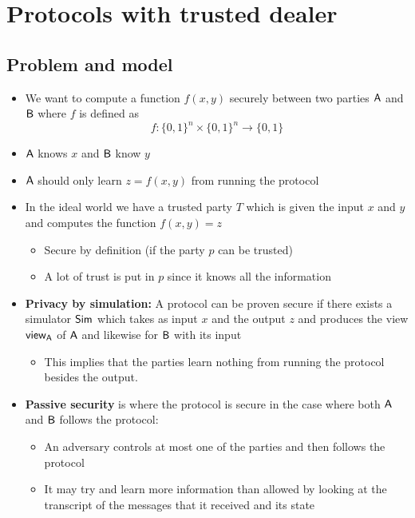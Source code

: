 \section{Protocols with trusted dealer}
\localtableofcontents
\subsection{Problem and model}%
\begin{itemize}
    \item We want to compute a function $f(x,y)$ securely between two parties $\mathsf{A}$ and $\mathsf{B}$ where $f$ is defined as 
    \begin{equation*}
        f : \{0,1\}^n \times \{0,1\}^n \to \{0,1\}
    \end{equation*}
    \item $\mathsf{A}$ knows $x$ and $\mathsf{B}$ know $y$
    \item $\mathsf{A}$ should only learn $z = f(x,y)$ from running the protocol
    \item In the ideal world we have a trusted party $T$ which is given the input $x$ and $y$ and computes the function $f(x,y) = z$ 
    \begin{itemize}
        \item Secure by definition (if the party $p$ can be trusted)
        \item A lot of trust is put in $p$ since it knows all the information
    \end{itemize}
    \item \textbf{Privacy by simulation:} A protocol can be proven secure if there exists a simulator $\mathsf{Sim}$ which takes as input $x$ and the output $z$ and produces the view $\mathsf{view}_{\mathsf{A}}$ of $\mathsf{A}$ and likewise for $\mathsf{B}$ with its input
        \begin{itemize}
            \item This implies that the parties learn nothing from running the protocol besides the output.
        \end{itemize}
    \item \textbf{Passive security} is where the protocol is secure in the case where both $\mathsf{A}$ and $\mathsf{B}$ follows the protocol:
    \begin{itemize}
        \item An adversary controls at most one of the parties and then follows the protocol 
        \item It may try and learn more information than allowed by looking at the transcript of the messages that it received and its state

\end{itemize}
\end{itemize}
